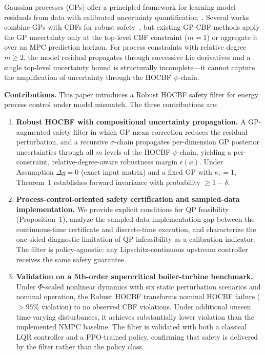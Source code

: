 Gaussian processes (GPs) offer a principled framework for learning model residuals from data with calibrated uncertainty quantification~\cite{rasmussen2006gp}. Several works combine GPs with CBFs for robust safety~\cite{cheng2019guaranteed,fisac2018general}, but existing GP-CBF methods apply the GP uncertainty only at the top-level CBF constraint ($m=1$) or aggregate it over an MPC prediction horizon. For process constraints with relative degree $m \geq 2$, the model residual propagates through successive Lie derivatives and a single top-level uncertainty bound is structurally incomplete---it cannot capture the amplification of uncertainty through the HOCBF $\psi$-chain.

\textbf{Contributions.} This paper introduces a Robust HOCBF safety filter for energy process control under model mismatch. The three contributions are:

\begin{enumerate}
    \item \textbf{Robust HOCBF with compositional uncertainty propagation.} A GP-augmented safety filter in which GP mean correction reduces the residual perturbation, and a recursive $\sigma$-chain propagates per-dimension GP posterior uncertainties through all $m$ levels of the HOCBF $\psi$-chain, yielding a per-constraint, relative-degree-aware robustness margin $\epsilon(x)$. Under Assumption $\Delta g = 0$ (exact input matrix) and a fixed GP with $\kappa_\epsilon = 1$, Theorem~1 establishes forward invariance with probability $\geq 1-\delta$.

    \item \textbf{Process-control-oriented safety certification and sampled-data implementation.} We provide explicit conditions for QP feasibility (Proposition~1), analyze the sampled-data implementation gap between the continuous-time certificate and discrete-time execution, and characterize the one-sided diagnostic limitation of QP infeasibility as a calibration indicator. The filter is policy-agnostic: any Lipschitz-continuous upstream controller receives the same safety guarantee.

    \item \textbf{Validation on a 5th-order supercritical boiler-turbine benchmark.} Under $\Phi$-scaled nonlinear dynamics with six static perturbation scenarios and nominal operation, the Robust HOCBF transforms nominal HOCBF failure ($>95\%$ violation) to no observed CBF violations. Under additional unseen time-varying disturbances, it achieves substantially lower violation than the implemented NMPC baseline. The filter is validated with both a classical LQR controller and a PPO-trained policy, confirming that safety is delivered by the filter rather than the policy class.
\end{enumerate}

